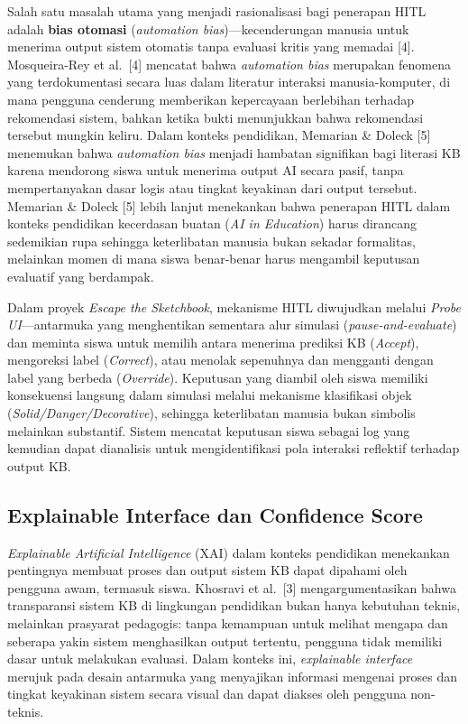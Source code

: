 \documentclass[10pt,twoside,openright]{report}
\begin{document}
Salah satu masalah utama yang menjadi rasionalisasi bagi penerapan HITL adalah \textbf{bias otomasi} (\textit{automation bias})---kecenderungan manusia untuk menerima output sistem otomatis tanpa evaluasi kritis yang memadai [4]. Mosqueira-Rey et al.\ [4] mencatat bahwa \textit{automation bias} merupakan fenomena yang terdokumentasi secara luas dalam literatur interaksi manusia-komputer, di mana pengguna cenderung memberikan kepercayaan berlebihan terhadap rekomendasi sistem, bahkan ketika bukti menunjukkan bahwa rekomendasi tersebut mungkin keliru. Dalam konteks pendidikan, Memarian \& Doleck [5] menemukan bahwa \textit{automation bias} menjadi hambatan signifikan bagi literasi KB karena mendorong siswa untuk menerima output AI secara pasif, tanpa mempertanyakan dasar logis atau tingkat keyakinan dari output tersebut. Memarian \& Doleck [5] lebih lanjut menekankan bahwa penerapan HITL dalam konteks pendidikan kecerdasan buatan (\textit{AI in Education}) harus dirancang sedemikian rupa sehingga keterlibatan manusia bukan sekadar formalitas, melainkan momen di mana siswa benar-benar harus mengambil keputusan evaluatif yang berdampak.

Dalam proyek \textit{Escape the Sketchbook}, mekanisme HITL diwujudkan melalui \textit{Probe UI}---antarmuka yang menghentikan sementara alur simulasi (\textit{pause-and-evaluate}) dan meminta siswa untuk memilih antara menerima prediksi KB (\textit{Accept}), mengoreksi label (\textit{Correct}), atau menolak sepenuhnya dan mengganti dengan label yang berbeda (\textit{Override}). Keputusan yang diambil oleh siswa memiliki konsekuensi langsung dalam simulasi melalui mekanisme klasifikasi objek (\textit{Solid/Danger/Decorative}), sehingga keterlibatan manusia bukan simbolis melainkan substantif. Sistem mencatat keputusan siswa sebagai log yang kemudian dapat dianalisis untuk mengidentifikasi pola interaksi reflektif terhadap output KB.

\subsection{Explainable Interface dan Confidence Score}
\label{subsec:explainable-interface}

\textit{Explainable Artificial Intelligence} (XAI) dalam konteks pendidikan menekankan pentingnya membuat proses dan output sistem KB dapat dipahami oleh pengguna awam, termasuk siswa. Khosravi et al.\ [3] mengargumentasikan bahwa transparansi sistem KB di lingkungan pendidikan bukan hanya kebutuhan teknis, melainkan prasyarat pedagogis: tanpa kemampuan untuk melihat mengapa dan seberapa yakin sistem menghasilkan output tertentu, pengguna tidak memiliki dasar untuk melakukan evaluasi. Dalam konteks ini, \textit{explainable interface} merujuk pada desain antarmuka yang menyajikan informasi mengenai proses dan tingkat keyakinan sistem secara visual dan dapat diakses oleh pengguna non-teknis.
\end{document}
